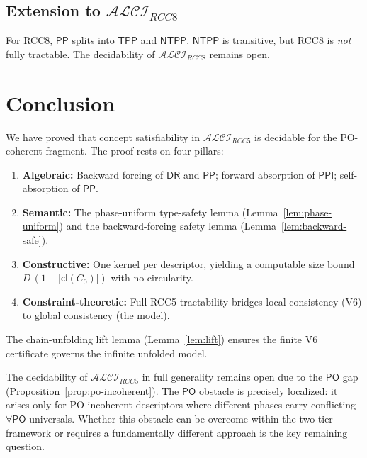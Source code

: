 \documentclass[a4paper,11pt]{article}
\theoremstyle{definition}
\newcommand{\ALCIRCC}[1]{\ensuremath{\mathcal{ALCI}_{\mathit{RCC#1}}}}
\newcommand{\DR}{\ensuremath{\mathsf{DR}}}
\newcommand{\PO}{\ensuremath{\mathsf{PO}}}
\newcommand{\PP}{\ensuremath{\mathsf{PP}}}
\newcommand{\PPI}{\ensuremath{\mathsf{PPI}}}
\newcommand{\cl}{\ensuremath{\mathsf{cl}}}
\begin{document}
\subsection{Extension to $\ALCIRCC{8}$}

For RCC8, $\PP$ splits into $\mathsf{TPP}$ and $\mathsf{NTPP}$.
$\mathsf{NTPP}$ is transitive, but RCC8 is \emph{not} fully
tractable.  The decidability of $\ALCIRCC{8}$ remains open.


\section{Conclusion}\label{sec:conclusion}

We have proved that concept satisfiability in $\ALCIRCC{5}$ is
decidable for the PO-coherent fragment.  The proof rests on four
pillars:
\begin{enumerate}
\item \textbf{Algebraic:} Backward forcing of $\DR$ and $\PP$;
  forward absorption of $\PPI$; self-absorption of $\PP$.
\item \textbf{Semantic:} The phase-uniform type-safety lemma
  (Lemma~\ref{lem:phase-uniform}) and the backward-forcing safety
  lemma (Lemma~\ref{lem:backward-safe}).
\item \textbf{Constructive:} One kernel per descriptor, yielding
  a computable size bound $D\,(1 + |\cl(C_0)|)$ with no circularity.
\item \textbf{Constraint-theoretic:} Full RCC5 tractability bridges
  local consistency (V6) to global consistency (the model).
\end{enumerate}

The chain-unfolding lift lemma (Lemma~\ref{lem:lift}) ensures the
finite V6 certificate governs the infinite unfolded model.

The decidability of $\ALCIRCC{5}$ in full generality remains open
due to the $\PO$ gap (Proposition~\ref{prop:po-incoherent}).  The
$\PO$ obstacle is precisely localized: it arises only for
PO-incoherent descriptors where different phases carry conflicting
$\forall\PO$ universals.  Whether this obstacle can be overcome
within the two-tier framework or requires a fundamentally different
approach is the key remaining question.
\end{document}
